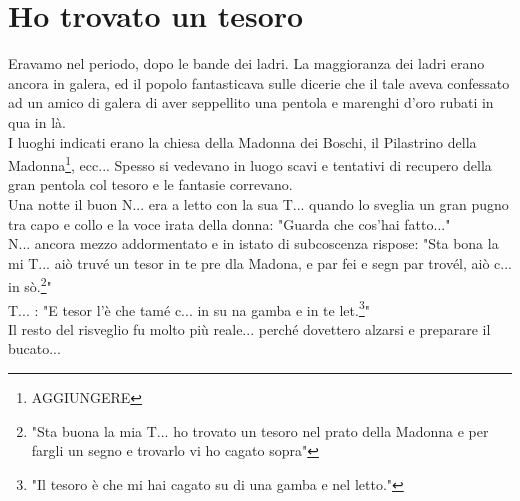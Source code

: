 
\chapter{Ho trovato un tesoro}

Eravamo nel periodo, dopo le bande dei ladri. La maggioranza dei ladri erano ancora in galera, ed il popolo fantasticava sulle dicerie che il tale aveva confessato ad un amico di galera di aver seppellito una pentola e marenghi d'oro rubati in qua in là.\\
I luoghi indicati erano la chiesa della Madonna dei Boschi, il Pilastrino della Madonna\footnote{AGGIUNGERE}, ecc... Spesso si vedevano in luogo scavi e tentativi di recupero della gran pentola col tesoro e le fantasie correvano.\\
Una notte il buon N\:.\:.\:. era a letto con la sua T\:.\:.\:. quando lo sveglia un gran pugno tra capo e collo e la voce irata della donna: "Guarda che cos'hai fatto..."\\
N\:.\:.\:. ancora mezzo addormentato e in istato di subcoscenza rispose: "Sta bona la mi T\:.\:.\:. aiò truvé un tesor in te pre dla Madona, e par fei e segn par trovél, aiò c... in sò.\footnote{"Sta buona la mia T\:.\:.\:. ho trovato un tesoro nel prato della Madonna e per fargli un segno e trovarlo vi ho cagato sopra"}"\\
T\:.\:.\:. : "E tesor l'è che tamé c...  in su na gamba e in te let.\footnote{"Il tesoro è che mi hai cagato su di una gamba e nel letto."}"\\
Il resto del risveglio fu molto più reale... perché dovettero alzarsi e preparare il bucato...


